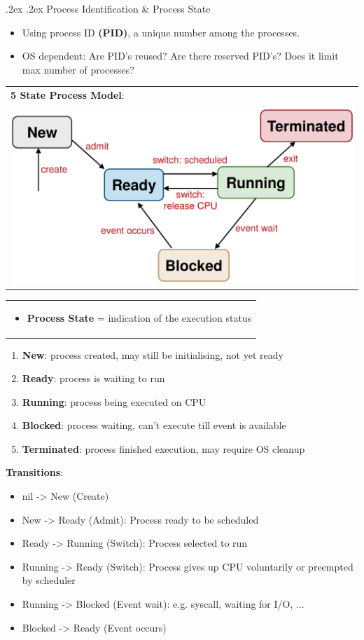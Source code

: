 \documentclass[10pt,landscape,a4paper]{article}
\makeatletter
\renewcommand{\subsection}{\@startsection{subsection}{1}{0mm}%
  {.2ex}%
  {.2ex}%
{\sffamily\bfseries}}
\makeatother
\begin{document}
\begin{multicols*}{4}
  \subsection{Process Identification \& Process State}
  \begin{itemize}
    \item Using process ID \textbf{(PID)}, a unique number among the processes.
    \item OS dependent: Are PID's reused? Are there reserved PID's? Does it limit max number of processes?
  \end{itemize}
  \begin{tabular}{l}
    \textbf{5 State Process Model}: \\
    \includegraphics[width=0.55\linewidth]{process-state}
  \end{tabular}
  \begin{tabularx}{0.4\columnwidth}{X}
    \begin{itemize}
      \item \textbf{Process State} = indication of the execution status
    \end{itemize}
  \end{tabularx}
  \begin{enumerate}
    \item \textbf{New}: process created, may still be initialising, not yet ready
    \item \textbf{Ready}: process is waiting to run
    \item \textbf{Running}: process being executed on CPU
    \item \textbf{Blocked}: process waiting, can't execute till event is available
    \item \textbf{Terminated}: process finished execution, may require OS cleanup
  \end{enumerate}
  \textbf{Transitions}:
  \begin{itemize}
    \item nil -> New (Create)
    \item New -> Ready (Admit): Process ready to be scheduled
    \item Ready -> Running (Switch): Process selected to run
    \item Running -> Ready (Switch): Process gives up CPU voluntarily or preempted by scheduler
    \item Running -> Blocked (Event wait): e.g. syscall, waiting for I/O, ...
    \item Blocked -> Ready (Event occurs)
  \end{itemize}

\end{multicols*}
\end{document}

